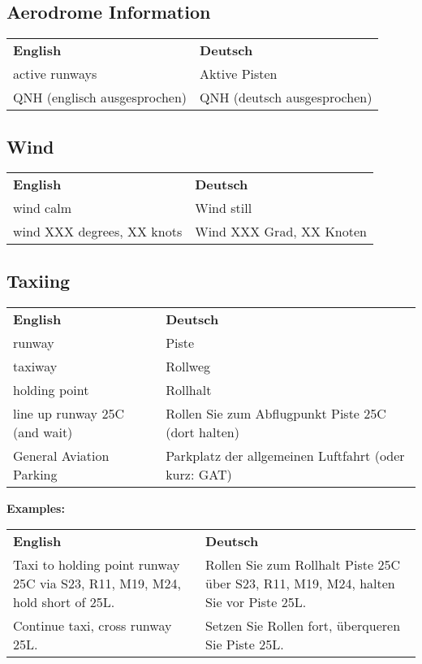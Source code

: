 \subsection{Aerodrome Information}
\begin{table}[H]
	\begin{tabularx}{\textwidth}{XX}
		\textbf{English} 				& \textbf{Deutsch}     								   \\
		active runways               & Aktive Pisten               \\
		QNH (englisch ausgesprochen) & QNH (deutsch ausgesprochen)                        
	\end{tabularx}
\end{table}
\subsection{Wind}
\begin{table}[H]
	\begin{tabularx}{\textwidth}{XX}
		\textbf{English} 				& \textbf{Deutsch}     								   \\
		wind calm                  & Wind still               \\
		wind XXX degrees, XX knots & Wind XXX Grad, XX Knoten
	\end{tabularx}
\end{table}

\subsection{Taxiing}
\begin{table}[H]
	\begin{tabularx}{\textwidth}{XX}
		\textbf{English} 				& \textbf{Deutsch}     								   \\
		runway                        	& Piste                                                \\
		taxiway                       	& Rollweg                                              \\
		holding point                 	& Rollhalt                                             \\
		line up runway 25C (and wait) 	& Rollen Sie zum Abflugpunkt Piste 25C (dort halten)   \\
		General Aviation Parking     	& Parkplatz der allgemeinen Luftfahrt (oder kurz: GAT)
	\end{tabularx}
\end{table}
\textbf{Examples:}
\begin{table}[H]
	\begin{tabularx}{\textwidth}{XX}
		\textbf{English} 															& \textbf{Deutsch}      															   \\
		Taxi to holding point runway 25C via S23, R11, M19, M24, hold short of 25L. & Rollen Sie zum Rollhalt Piste 25C über S23, R11, M19, M24, halten Sie vor Piste 25L. \\
		Continue taxi, cross runway 25L.                                            & Setzen Sie Rollen fort, überqueren Sie Piste 25L.
	\end{tabularx}
\end{table}

